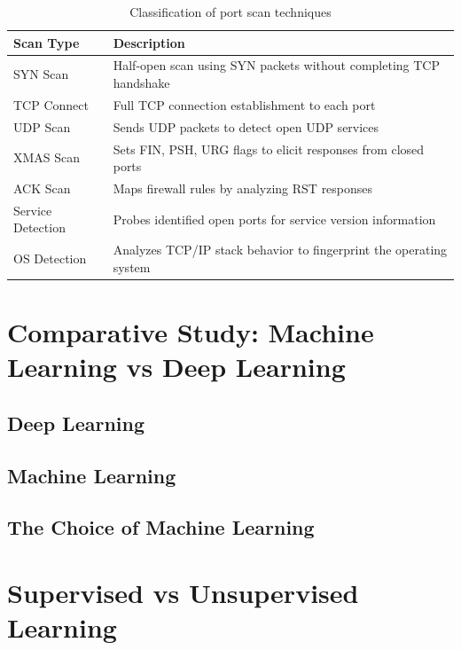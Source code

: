 \begin{table}[H]
\centering
\caption{Classification of port scan techniques}
\label{tab:scan_taxonomy}
\begin{tabularx}{\textwidth}{lX}
\toprule
\textbf{Scan Type} & \textbf{Description} \\
\midrule
SYN Scan & Half-open scan using SYN packets without completing TCP handshake \\
TCP Connect & Full TCP connection establishment to each port \\
UDP Scan & Sends UDP packets to detect open UDP services \\
XMAS Scan & Sets FIN, PSH, URG flags to elicit responses from closed ports \\
ACK Scan & Maps firewall rules by analyzing RST responses \\
Service Detection & Probes identified open ports for service version information \\
OS Detection & Analyzes TCP/IP stack behavior to fingerprint the operating system \\
\bottomrule
\end{tabularx}
\end{table}

\section{Comparative Study: Machine Learning vs Deep Learning}

\subsection{Deep Learning}

\subsection{Machine Learning}

\subsection{The Choice of Machine Learning}

\section{Supervised vs Unsupervised Learning}

